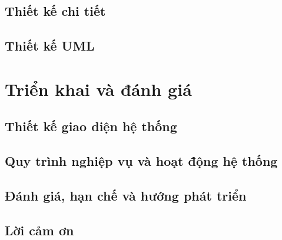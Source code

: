 \documentclass[letterpaper,11pt,leqno]{book}
\begin{document}
\chapter{Thiết kế chi tiết}\label{c:detailed}


\chapter{Thiết kế UML}\label{c:uml}


\part{Triển khai và đánh giá}\label{p:implementation}

\chapter{Thiết kế giao diện hệ thống}\label{c:interface}


\chapter{Quy trình nghiệp vụ và hoạt động hệ thống}\label{c:workflow}


\chapter{Đánh giá, hạn chế và hướng phát triển}\label{c:evaluation}


\chapter{Lời cảm ơn}

\end{document}

